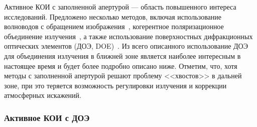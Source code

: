 Активное КОИ с заполненной апертурой --- область повышенного интереса исследований. Предложено несколько методов, включая использование волноводов с обращением изображения~\cite{Jain125}, когерентное поляризационное объединение излучения~\cite{Jain126}, а также использование поверхностных дифракционных оптических элементов (ДОЭ, DOE)~\cite{Jain120, Jain127,Jain128,Jain129,Jain130}. Из всего описанного использование ДОЭ для объединения излучения в ближней зоне   является наиболее интересным в настоящее время и будет более подробно описано ниже. Отметим, что, хотя методы с заполненной апертурой решают проблему <<хвостов>> в дальней зоне, при это теряется возможность регулировки излучения и коррекции атмосферных искажений.

\subsubsection{Активное КОИ с ДОЭ}

